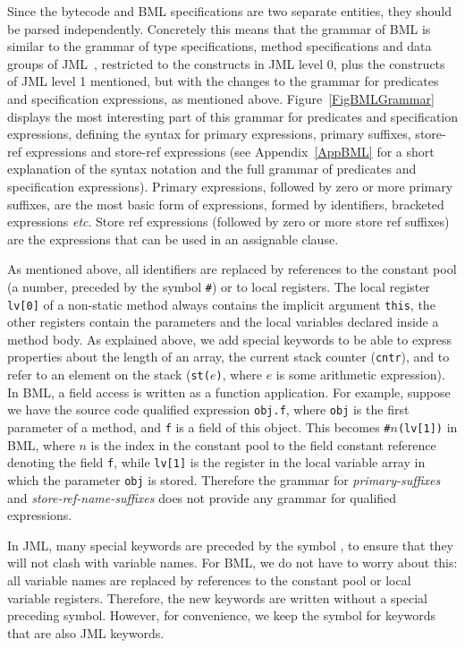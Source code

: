Since the bytecode and BML specifications are two separate entities,
they should be parsed independently. Concretely this means that the
grammar of BML is similar to the grammar of type specifications,
method specifications and data groups of JML~\cite[\S A.5, A.6,
A.7]{JMLReferenceManual05}, restricted to the constructs in JML level
0, plus the constructs of JML level 1 mentioned, but with the changes
to the grammar for predicates and specification expressions, as
mentioned above. Figure~\ref{FigBMLGrammar} displays the most
interesting part of this grammar for predicates and specification
expressions, defining the syntax for primary expressions, primary
suffixes, store-ref expressions and store-ref expressions (see
Appendix~\ref{AppBML} for a short explanation of the syntax notation
and the full grammar of predicates and specification
expressions). Primary expressions, followed by zero or more primary
suffixes, are the most basic form of expressions, formed by
identifiers, bracketed expressions
\emph{etc}. Store ref expressions (followed by zero or more store ref 
suffixes) are the expressions that can be used in an assignable
clause.

As mentioned above, all identifiers are replaced by references to the
constant pool (a number, preceded by the symbol
\texttt{\#}) or to local registers. The local register \texttt{lv[0]}
of a non-static method always contains the implicit argument
\texttt{this}, the other registers contain the parameters and the
local variables declared inside a method body. As explained above, we
add special keywords to be able to express properties about the length
of an array, the current stack counter (\texttt{cntr}), and to refer
to an element on the stack (\texttt{st(\(e\))}, where \(e\) is some
arithmetic expression). In BML, a field access is written as a function
application. For example, suppose we have the source code qualified expression
\texttt{obj.f}, where \texttt{obj} is the first parameter of a
method, and \texttt{f} is a field of this object. This becomes
\texttt{\#\(n\)(lv[1])} in BML, where \(n\) is the index in the
constant pool to the field constant reference denoting the field
\texttt{f}, while \texttt{lv[1]} is the register in the local variable
array in which the parameter \texttt{obj} is stored.  Therefore the
grammar for \emph{primary-suffixes} and \emph{store-ref-name-suffixes}
does not provide any grammar for qualified expressions.


In JML, many special keywords are preceded by the symbol
\texttt{\bsl}, to ensure that they will not clash with variable
names. For BML, we do not have to worry about this: all
variable names are replaced by references to the constant pool or
local variable registers. Therefore, the new keywords are written
without a special preceding symbol. However, for convenience, we keep
the symbol for keywords that are also JML keywords.

